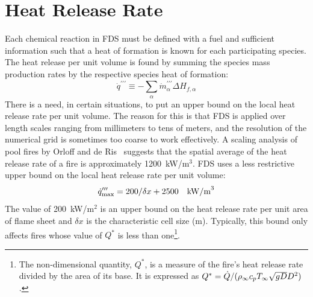 %

\section{Heat Release Rate}

Each chemical reaction in FDS must be defined with a fuel and sufficient information such that a heat of formation is known for each participating species. The heat release per unit volume is found by summing the species mass production rates by the respective species heat of formation:
\begin{equation}\label{eq:vol_heat_gen}
\dot{q}^{\prime\prime\prime} \equiv -\displaystyle \sum_{\alpha} \dot{m}^{\prime\prime\prime}_{\alpha} \Delta H_{f,\alpha}
\end{equation}
There is a need, in certain situations, to put an upper bound on the local heat release rate per unit volume. The reason for
this is that FDS is applied over length scales ranging from millimeters to tens of meters, and the resolution of the numerical grid
is sometimes too coarse to work effectively.
A scaling analysis of pool fires by Orloff and de Ris~\cite{Orloff:19th_Symposium} suggests that the spatial average of the
heat release rate of a fire is approximately 1200~kW/m$^3$. FDS uses a less restrictive upper bound on the local heat release rate per unit volume:
\begin{equation}\label{eq:q_bound} 
\dot{q}_{\max}''' = 200/\delta x + 2500 \quad \hbox{kW/m}^3 
\end{equation}
The value of 200~kW/m$^2$ is an upper bound on the heat release rate per unit area of flame sheet and $\delta x$ is the characteristic cell size (m). Typically, this bound only affects fires whose value of $Q^*$ is less than one\footnote{The non-dimensional quantity, $Q^*$, is a measure of the fire's heat release rate divided by the
area of its base. It is expressed as $Q^*=\dot{Q}/(\rho_\infty c_p T_\infty \sqrt{g D} D^2)$.}.


